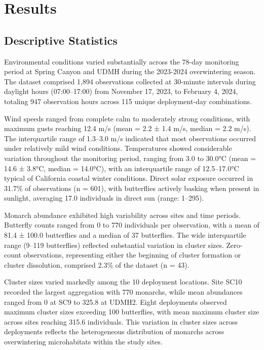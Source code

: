 \section{Results}

\subsection{Descriptive Statistics}

Environmental conditions varied substantially across the 78-day monitoring period at Spring Canyon and UDMH during the 2023-2024 overwintering season. The dataset comprised 1,894 observations collected at 30-minute intervals during daylight hours (07:00--17:00) from November 17, 2023, to February 4, 2024, totaling 947 observation hours across 115 unique deployment-day combinations.

Wind speeds ranged from complete calm to moderately strong conditions, with maximum gusts reaching 12.4 m/s (mean = 2.2 ± 1.4 m/s, median = 2.2 m/s). The interquartile range of 1.3--3.0 m/s indicated that most observations occurred under relatively mild wind conditions. Temperatures showed considerable variation throughout the monitoring period, ranging from 3.0 to 30.0°C (mean = 14.6 ± 3.8°C, median = 14.0°C), with an interquartile range of 12.5--17.0°C typical of California coastal winter conditions. Direct solar exposure occurred in 31.7\% of observations (n = 601), with butterflies actively basking when present in sunlight, averaging 17.0 individuals in direct sun (range: 1--295).

Monarch abundance exhibited high variability across sites and time periods. Butterfly counts ranged from 0 to 770 individuals per observation, with a mean of 81.4 ± 100.0 butterflies and a median of 37 butterflies. The wide interquartile range (9--119 butterflies) reflected substantial variation in cluster sizes. Zero-count observations, representing either the beginning of cluster formation or cluster dissolution, comprised 2.3\% of the dataset (n = 43).

Cluster sizes varied markedly among the 10 deployment locations. Site SC10 recorded the largest aggregation with 770 monarchs, while mean abundances ranged from 0 at SC9 to 325.8 at UDMH2. Eight deployments observed maximum cluster sizes exceeding 100 butterflies, with mean maximum cluster size across sites reaching 315.6 individuals. This variation in cluster sizes across deployments reflects the heterogeneous distribution of monarchs across overwintering microhabitats within the study sites.

